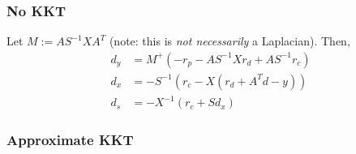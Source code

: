 \documentclass[10pt,a4paper]{article}
\begin{document}
\subsubsection{No KKT}

Let $M := AS^{-1}XA^T$ (note: this is \emph{not necessarily} a Laplacian). Then,
\begin{align*}
d_y &= M^+(-r_p - AS^{-1}Xr_d + AS^{-1}r_c) \\
d_x &= -S^{-1}(r_c - X(r_d + A^Td-y))\\
d_s &= -X^{-1}(r_c + Sd_x)
\end{align*}

\subsubsection{Approximate KKT}
\end{document}
